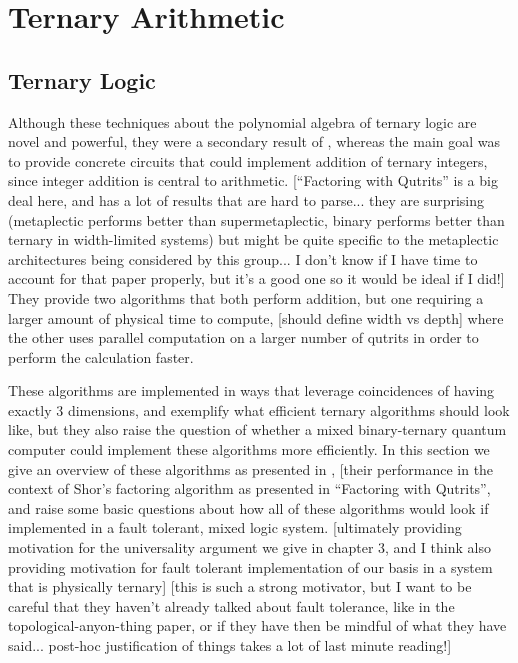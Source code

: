 \chapter[TERNARY ARITHMETIC]{Ternary Arithmetic}
\section{Ternary Logic}
Although these techniques about the polynomial algebra of ternary logic are novel and powerful, they were a secondary result of \cite{arithmetics}, whereas the main goal was to provide concrete circuits that could implement addition of ternary integers, since integer addition is central to arithmetic. [``Factoring with Qutrits'' is a big deal here, and has a lot of results that are hard to parse... they are surprising (metaplectic performs better than supermetaplectic, binary performs better than ternary in width-limited systems) but might be quite specific to the metaplectic architectures being considered by this group... I don't know if I have time to account for that paper properly, but it's a good one so it would be ideal if I did!] They provide two algorithms that both perform addition, but one requiring a larger amount of physical time to compute, [should define width vs depth] where the other uses parallel computation on a larger number of qutrits in order to perform the calculation faster.

These algorithms are implemented in ways that leverage coincidences of having exactly 3 dimensions, and exemplify what efficient ternary algorithms should look like, but they also raise the question of whether a mixed binary-ternary quantum computer could implement these algorithms more efficiently. In this section we give an overview of these algorithms as presented in \cite{arithmetics}, [their performance in the context of Shor's factoring algorithm as presented in ``Factoring with Qutrits'', and raise some basic questions about how all of these algorithms would look if implemented in a fault tolerant, mixed logic system. [ultimately providing motivation for the universality argument we give in chapter 3, and I think also providing motivation for fault tolerant implementation of our basis in a system that is physically ternary] [this is such a strong motivator, but I want to be careful that they haven't already talked about fault tolerance, like in the topological-anyon-thing paper, or if they have then be mindful of what they have said... post-hoc justification of things takes a lot of last minute reading!]

